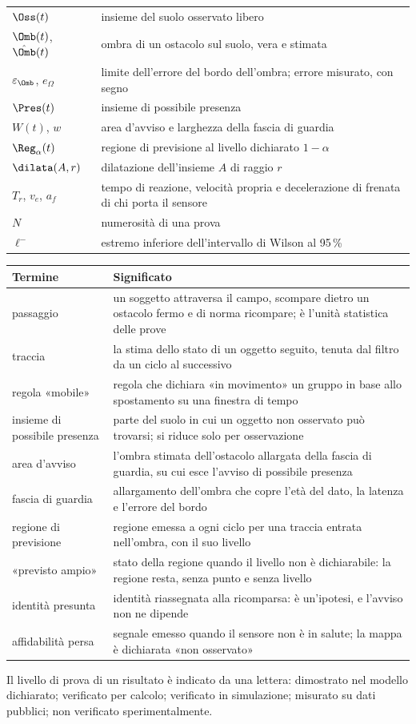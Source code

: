 {\begin{tabularx}{\textwidth}{@{}p{2.6cm}L@{}}
$\Oss(t)$ & insieme del suolo osservato libero\\
$\Omb(t)$, $\hat\Omb(t)$ & ombra di un ostacolo sul suolo, vera e stimata\\
$\varepsilon_\Omb$, $e_\Omega$ & limite dell'errore del bordo dell'ombra; errore misurato, con segno\\
$\Pres(t)$ & insieme di possibile presenza\\
$W(t)$, $w$ & area d'avviso e larghezza della fascia di guardia\\
$\Reg_\alpha(t)$ & regione di previsione al livello dichiarato $1-\alpha$\\
$\dilata(A,r)$ & dilatazione dell'insieme $A$ di raggio $r$\\
$T_r$, $v_e$, $a_f$ & tempo di reazione, velocità propria e decelerazione di frenata di chi porta il sensore\\
$N$ & numerosità di una prova\\
$\ell^-$ & estremo inferiore dell'intervallo di Wilson al 95\,\%\\
\bottomrule
\end{tabularx}

\medskip
\begin{tabularx}{\textwidth}{@{}p{3.6cm}L@{}}
\toprule
Termine & Significato\\
\midrule
passaggio & un soggetto attraversa il campo, scompare dietro un ostacolo fermo e di norma ricompare; è l'unità statistica delle prove\\
traccia & la stima dello stato di un oggetto seguito, tenuta dal filtro da un ciclo al successivo\\
regola «mobile» & regola che dichiara «in movimento» un gruppo in base allo spostamento su una finestra di tempo\\
insieme di possibile presenza & parte del suolo in cui un oggetto non osservato può trovarsi; si riduce solo per osservazione\\
area d'avviso & l'ombra stimata dell'ostacolo allargata della fascia di guardia, su cui esce l'avviso di possibile presenza\\
fascia di guardia & allargamento dell'ombra che copre l'età del dato, la latenza e l'errore del bordo\\
regione di previsione & regione emessa a ogni ciclo per una traccia entrata nell'ombra, con il suo livello\\
«previsto ampio» & stato della regione quando il livello non è dichiarabile: la regione resta, senza punto e senza livello\\
identità presunta & identità riassegnata alla ricomparsa: è un'ipotesi, e l'avviso non ne dipende\\
affidabilità persa & segnale emesso quando il sensore non è in salute; la mappa è dichiarata «non osservato»\\
\bottomrule
\end{tabularx}}

Il livello di prova di un risultato è indicato da una lettera:  dimostrato nel modello dichiarato;  verificato per calcolo;  verificato in simulazione;  misurato su dati pubblici;  non verificato sperimentalmente.
